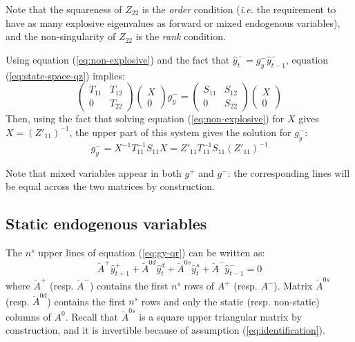 \documentclass[11pt,a4paper]{article}
\begin{document}
Note that the squareness of $Z_{22}$ is the \citet{blanchard/kahn:1980}
\emph{order} condition (\textit{i.e.} the requirement to have as many explosive
eigenvalues as forward or mixed endogenous variables), and the non-singularity
of $Z_{22}$ is the \citet{blanchard/kahn:1980} \emph{rank} condition.

Using equation (\ref{eq:non-explosive}) and the fact that $\hat{y}^-_t = g^-_y
\hat{y}^-_{t-1}$, equation (\ref{eq:state-space-qz}) implies:
\begin{equation*}
  \left(
    \begin{matrix}
      T_{11} & T_{12} \\
      0 & T_{22}
    \end{matrix}
  \right)
  \left(
    \begin{matrix}
      X \\
      0
    \end{matrix}
  \right)
  g^-_y
  =
  \left(
    \begin{matrix}
      S_{11} & S_{12} \\
      0 & S_{22}
    \end{matrix}
  \right)
  \left(
    \begin{matrix}
      X \\
      0
    \end{matrix}
  \right)
\end{equation*}
Then, using the fact that solving equation (\ref{eq:non-explosive}) for $X$
gives $X = (Z'_{11})^{-1}$, the upper part of this system gives the solution
for $g^-_y$:
\begin{equation*}
  g^-_y = X^{-1} T_{11}^{-1}S_{11}X = Z'_{11}T_{11}^{-1}S_{11}(Z'_{11})^{-1}
\end{equation*}

Note that mixed variables appear in both $g^+$ and $g^-$: the corresponding
lines will be equal across the two matrices by construction.

\subsection{Static endogenous variables}

The $n^s$ upper lines of equation (\ref{eq:gy-qr}) can be written as:
\begin{equation}
  \label{eq:static-part}
  \breve{A}^+ \hat{y}^+_{t+1} + \breve{A}^{0d} \hat{y}^d_t + \breve{A}^{0s} \hat{y}^{s}_t + \breve{A}^- \hat{y}^-_{t-1} = 0
\end{equation}
where $\breve{A}^+$ (resp. $\breve{A}^-$) contains the first $n^s$ rows of
$A^+$ (resp. $A^-$). Matrix $\breve{A}^{0s}$ (resp. $\breve{A}^{0d}$) contains
the first $n^s$ rows and only the static (resp. non-static) columns of
$A^0$. Recall that $\breve{A}^{0s}$ is a square upper triangular matrix by
construction, and it is invertible because of assumption
(\ref{eq:identification}).
\end{document}
